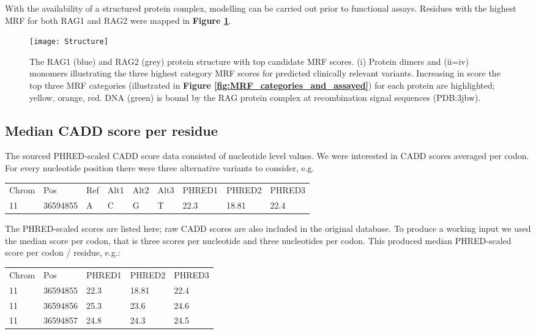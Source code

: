 \documentclass[preprint,11pt,fleqn]{elsarticle}
\begin{document}
\noindent With the availability of a structured protein complex, modelling can be carried out prior to functional assays. Residues with the highest MRF for both RAG1 and RAG2 were mapped in
\textbf{Figure \ref{fig:Structure}}.

\begin{figure}[!h]
\hspace*{1cm}   %
	\texttt{[image: Structure]}
	\caption{The RAG1 (blue) and RAG2 (grey) protein structure with top candidate MRF scores. 
(i) Protein dimers and (ii=iv) monomers illustrating the three highest category MRF scores for predicted clinically relevant variants. 
Increasing in score the top three MRF categories (illustrated in 
\textbf{Figure \ref{fig:MRF_categories_and_assayed}})
for each protein are highlighted; yellow, orange, red. 
DNA (green) is bound by the RAG protein complex at recombination signal sequences (PDB:3jbw).}
	\label{fig:Structure}
\end{figure}
\clearpage

\subsection*{\textbf{Median CADD score per residue}}
\noindent The sourced PHRED-scaled CADD score data consisted of nucleotide level values. 
We were interested in CADD scores averaged per codon.
For every nucleotide position there were three alternative variants to consider, e.g.
\begin{tabularx}{\textwidth}{*{9}{Z}}
{Chrom} & {Pos} & {Ref} & {Alt1} & {Alt2} & {Alt3} & {PHRED1} & {PHRED2} & {PHRED3} \\
{11} & {36594855} & {A} & {C} & {G} & {T} & {22.3} & {18.81} & {22.4}
\end{tabularx}
\noindent The PHRED-scaled scores are listed here; raw CADD scores are also included in the original database.
To produce a working input we used the median score per codon, that is three scores per nucleotide and three nucleotides per codon.
This produced median PHRED-scaled score per codon / residue, e.g.:
\begin{tabularx}{\textwidth}{*{5}{Z}}
{Chrom} & {Pos} & {PHRED1} & {PHRED2} & {PHRED3} \\
{11} & {36594855} & {22.3} & {18.81} & {22.4} \\
{11} & {36594856} & {25.3} & {23.6} & {24.6} \\
{11} & {36594857} & {24.8} & {24.3} & {24.5} \\
\end{tabularx}
\end{document}
